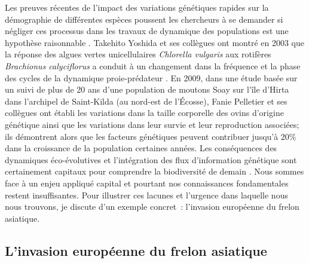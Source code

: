 Les preuves récentes de l'impact des variations génétiques rapides sur
la démographie de différentes espèces poussent les chercheurs à se
demander si négliger ces processus dans les travaux de dynamique des
populations est une hypothèse raisonnable
\citep{Pelletier2009, Post2009, Schoener2011}. Takehito Yoshida et ses
collègues ont montré en 2003 que la réponse des algues vertes
unicellulaires \emph{Chlorella vulgaris} aux rotifères \emph{Brachionus
calyciflorus} a conduit à un changement dans la fréquence et la phase
des cycles de la dynamique proie-prédateur \citep{Yoshida2003}. En 2009,
dans une étude basée sur un suivi de plus de 20 ans d'une population de
moutons Soay sur l'île d'Hirta dans l'archipel de Saint-Kilda (au
nord-est de l'Écosse), Fanie Pelletier et ses collègues ont établi les
variations dans la taille corporelle des ovins d'origine génétique ainsi
que les variations dans leur survie et leur reproduction associées; ils
démontrent alors que les facteurs génétiques peuvent contribuer jusqu'à
20\% dans la croissance de la population certaines années. Les
conséquences des dynamiques éco-évolutives et l'intégration des flux
d'information génétique sont certainement capitaux pour comprendre la
biodiversité de demain \citep{Sexton2009, Lavergne2010}. Nous sommes
face à un enjeu appliqué capital et pourtant nos connaissances
fondamentales restent insuffisantes. Pour illustrer ces lacunes et
l'urgence dans laquelle nous nous trouvons, je discute d'un exemple
concret~: l'invasion européenne du frelon asiatique.

\subsection*{L'invasion européenne du frelon
asiatique}\label{linvasion-europuxe9enne-du-frelon-asiatique}

